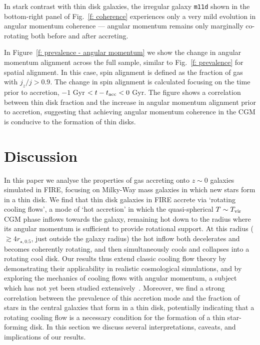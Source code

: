 \documentclass[fleqn,usenatbib]{mnras}
\newcommand{\tacc}{t_{\rm acc}}
\newcommand{\Tvir}{T_{\rm vir}}
\begin{document}
In stark contrast with thin disk galaxies, the irregular galaxy \texttt{m11d} shown in the bottom-right panel of Fig.~\ref{f: coherence} experiences only a very mild evolution in angular momentum coherence --- angular momentum remains only marginally co-rotating both before and after accreting.

In Figure~\ref{f: prevalence - angular momentum} we show the change in angular momentum alignment across the full sample, similar to Fig.~\ref{f: prevalence} for spatial alignment. 
In this case, spin alignment is defined as the fraction of gas with $j_z/j > 0.9$.
The change in spin alignment is calculated focusing on the time prior to accretion, $-1$ Gyr $< t - \tacc < 0$ Gyr.
The figure shows a correlation between thin disk fraction and the increase in angular momentum alignment prior to accretion, suggesting that achieving angular momentum coherence in the CGM is conducive to the formation of thin disks.

\section{Discussion}
\label{s: discussion}

In this paper we analyse the properties of gas accreting onto $z\sim0$ galaxies simulated in FIRE, focusing on Milky-Way mass galaxies in which new stars form in a thin disk. 
We find that thin disk galaxies in FIRE accrete via `rotating cooling flows', a mode of `hot accretion' in which the quasi-spherical $T\sim\Tvir$ CGM phase inflows towards the galaxy, remaining hot down to the radius where its angular momentum is sufficient to provide rotational support.
At this radius ($\gtrsim 4 r_{\star,0.5}$, just outside the galaxy radius) the hot inflow both decelerates and becomes coherently rotating, and then simultaneously cools and collapses into a rotating cool disk.
Our results thus extend classic cooling flow theory by demonstrating their applicability in realistic cosmological simulations, and by exploring the mechanics of cooling flows with angular momentum, a subject which has not yet been studied extensively~\citep[c.f.][]{Cowie1980, Stern2020}.
Moreover, we find a strong correlation between the prevalence of this accretion mode and the fraction of stars in the central galaxies that form in a thin disk, potentially indicating that a rotating cooling flow is a necessary condition for the formation of a thin star-forming disk.
In this section we discuss several interpretations, caveats, and implications of our results. 
\end{document}
